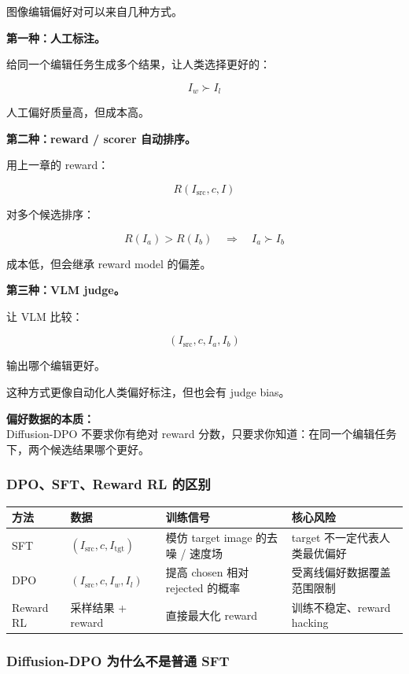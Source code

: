 图像编辑偏好对可以来自几种方式。

\textbf{第一种：人工标注。}

给同一个编辑任务生成多个结果，让人类选择更好的：

\[
I_w \succ I_l
\]

人工偏好质量高，但成本高。

\textbf{第二种：reward / scorer 自动排序。}

用上一章的 reward：

\[
R(I_\text{src},c,I)
\]

对多个候选排序：

\[
R(I_a)>R(I_b)
\quad\Rightarrow\quad
I_a\succ I_b
\]

成本低，但会继承 reward model 的偏差。

\textbf{第三种：VLM judge。}

让 VLM 比较：

\[
(I_\text{src},c,I_a,I_b)
\]

输出哪个编辑更好。

这种方式更像自动化人类偏好标注，但也会有 judge bias。

\begin{summarybox}
\textbf{偏好数据的本质：}\\
Diffusion-DPO 不要求你有绝对 reward 分数，只要求你知道：在同一个编辑任务下，两个候选结果哪个更好。
\end{summarybox}

\subsubsection{DPO、SFT、Reward RL 的区别}

\begin{center}
{\small
\begin{tabular}{p{2.7cm}p{3.6cm}p{4.2cm}p{3.4cm}}
\hline
\textbf{方法} & \textbf{数据} & \textbf{训练信号} & \textbf{核心风险} \\
\hline
SFT
&
$(I_\text{src},c,I_\text{tgt})$
&
模仿 target image 的去噪 / 速度场
&
target 不一定代表人类最优偏好
\\
DPO
&
$(I_\text{src},c,I_w,I_l)$
&
提高 chosen 相对 rejected 的概率
&
受离线偏好数据覆盖范围限制
\\
Reward RL
&
采样结果 + reward
&
直接最大化 reward
&
训练不稳定、reward hacking
\\
\hline
\end{tabular}
}
\end{center}

\subsubsection{Diffusion-DPO 为什么不是普通 SFT}

